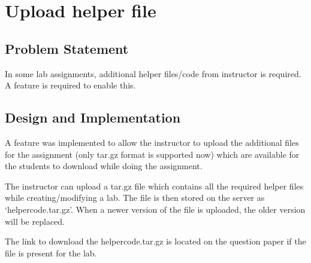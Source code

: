 \section{Upload helper file}
\subsection{Problem Statement}
In some lab assignments, additional helper files/code from instructor is required. A feature is required to enable this.
\subsection{Design and Implementation}
A feature was implemented to allow the instructor to upload the additional files for the assignment (only tar.gz format is supported now) which are available for the students to download while doing the assignment.

The instructor can upload a tar.gz file which contains all the required helper files while creating/modifying a lab. The file is then stored on the server as `helpercode.tar.gz'. When a newer version of the file is uploaded, the older version will be replaced.

The link to download the helpercode.tar.gz is located on the question paper if the file is present for the lab.